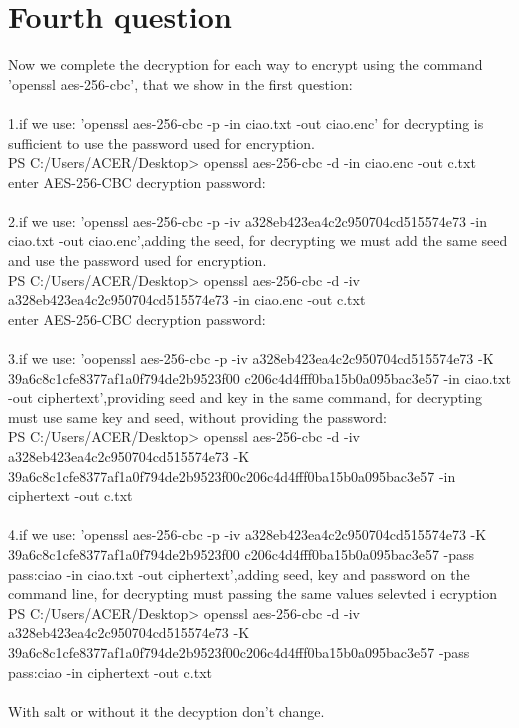 \documentclass{article}
\begin{document}
\section{Fourth question}
Now we complete the decryption for each way to encrypt using the command 'openssl aes-256-cbc', that we show in the first question:\\\\
1.if we use: 'openssl aes-256-cbc -p -in ciao.txt -out ciao.enc' for decrypting is sufficient to use the password used for encryption.\\
PS C:/Users/ACER/Desktop> openssl aes-256-cbc -d -in ciao.enc -out c.txt\\
enter AES-256-CBC decryption password:\\\\
2.if we use: 'openssl aes-256-cbc -p -iv a328eb423ea4c2c950704cd515574e73 -in ciao.txt -out ciao.enc',adding the seed, for decrypting we must add the same seed and use the password used for encryption.\\
PS C:/Users/ACER/Desktop> openssl aes-256-cbc -d -iv a328eb423ea4c2c950704cd515574e73 -in ciao.enc -out c.txt\\
enter AES-256-CBC decryption password:\\\\
3.if we use: 'oopenssl aes-256-cbc -p -iv a328eb423ea4c2c950704cd515574e73 -K 39a6c8c1cfe8377af1a0f794de2b9523f00 c206c4d4fff0ba15b0a095bac3e57 -in ciao.txt -out ciphertext',providing seed and key in the same command, for decrypting must use same key and seed, without providing the password:\\
PS C:/Users/ACER/Desktop> openssl aes-256-cbc -d -iv a328eb423ea4c2c950704cd515574e73 -K 39a6c8c1cfe8377af1a0f794de2b9523f00c206c4d4fff0ba15b0a095bac3e57 -in ciphertext -out c.txt\\\\
4.if we use: 'openssl aes-256-cbc -p -iv a328eb423ea4c2c950704cd515574e73 -K 39a6c8c1cfe8377af1a0f794de2b9523f00 c206c4d4fff0ba15b0a095bac3e57 -pass pass:ciao -in ciao.txt -out ciphertext',adding seed, key and password on the command line, for decrypting must passing the same values selevted i ecryption\\
PS C:/Users/ACER/Desktop> openssl aes-256-cbc -d -iv a328eb423ea4c2c950704cd515574e73 -K 39a6c8c1cfe8377af1a0f794de2b9523f00c206c4d4fff0ba15b0a095bac3e57 -pass pass:ciao -in ciphertext -out c.txt\\\\
With salt or without it the decyption don't change.
\end{document}
